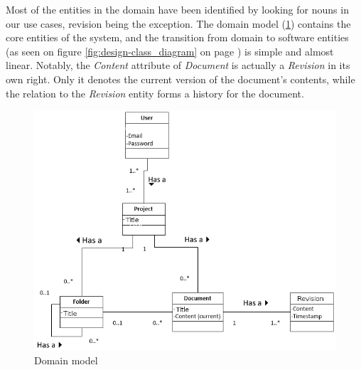 Most of the entities in the \SOP{} domain have been identified by looking for nouns in our use cases, revision being the exception.
The domain model (\ref{fig:domain-model}) contains the core entities of the \SOP{} system, and the transition from domain to software entities (as seen on figure \ref{fig:design-class_diagram} on page \pageref{fig:design-class_diagram}) is simple and almost linear.
Notably, the \emph{Content} attribute of \emph{Document} is actually a \emph{Revision} in 
its own right. Only it denotes the current version of the document's contents, while the relation to the \emph{Revision} entity forms a history for the document.
\begin{figure}[hbt]
	\centering
	\includegraphics[width=1\textwidth]{Software_analysis/graphics/Domain_model.png}
	\caption{Domain model}
	\label{fig:domain-model}
\end{figure}
	
